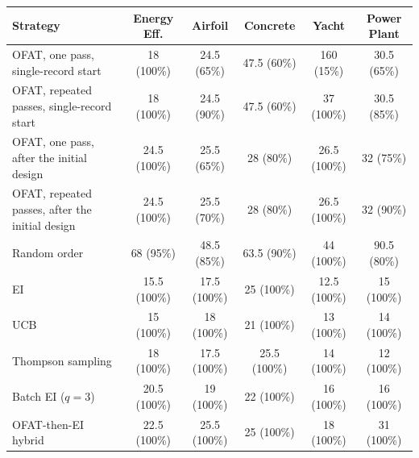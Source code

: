 \footnotesize\setlength{\tabcolsep}{2pt}%
\begin{tabular}{@{}lccccc@{}}
\toprule
Strategy & Energy Eff. & Airfoil & Concrete & Yacht & Power Plant \\
\midrule
OFAT, one pass, single-record start & 18 (100\%) & 24.5 (65\%) & 47.5 (60\%) & 160 (15\%) & 30.5 (65\%) \\
OFAT, repeated passes, single-record start & 18 (100\%) & 24.5 (90\%) & 47.5 (60\%) & 37 (100\%) & 30.5 (85\%) \\
OFAT, one pass, after the initial design & 24.5 (100\%) & 25.5 (65\%) & 28 (80\%) & 26.5 (100\%) & 32 (75\%) \\
OFAT, repeated passes, after the initial design & 24.5 (100\%) & 25.5 (70\%) & 28 (80\%) & 26.5 (100\%) & 32 (90\%) \\
Random order & 68 (95\%) & 48.5 (85\%) & 63.5 (90\%) & 44 (100\%) & 90.5 (80\%) \\
EI & 15.5 (100\%) & 17.5 (100\%) & 25 (100\%) & 12.5 (100\%) & 15 (100\%) \\
UCB & 15 (100\%) & 18 (100\%) & 21 (100\%) & 13 (100\%) & 14 (100\%) \\
Thompson sampling & 18 (100\%) & 17.5 (100\%) & 25.5 (100\%) & 14 (100\%) & 12 (100\%) \\
Batch EI ($q=3$) & 20.5 (100\%) & 19 (100\%) & 22 (100\%) & 16 (100\%) & 16 (100\%) \\
OFAT-then-EI hybrid & 22.5 (100\%) & 25.5 (100\%) & 25 (100\%) & 18 (100\%) & 31 (100\%) \\
\bottomrule
\end{tabular}
